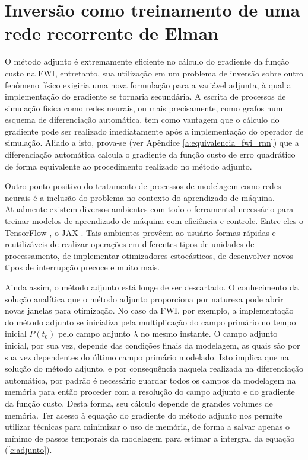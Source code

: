   \section{Inversão como treinamento de uma rede recorrente de Elman}

    O método adjunto é extremamente eficiente no cálculo do gradiente da função custo na FWI, entretanto, sua utilização em um problema de inversão sobre outro fenômeno físico exigiria uma nova formulação para a variável adjunta, à qual a implementação do gradiente se tornaria secundária. A escrita de processos de simulação física como redes neurais, ou mais precisamente, como grafos num esquema de diferenciação automática, tem como vantagem que o cálculo do gradiente pode ser realizado imediatamente após a implementação do operador de simulação. Aliado a isto, prova-se (ver Apêndice \ref{a:equivalencia_fwi_rnn}) que a diferenciação automática calcula o gradiente da função custo de erro quadrático de forma equivalente ao procedimento realizado no método adjunto.

    Outro ponto positivo do tratamento de processos de modelagem como redes neurais é a inclusão do problema no contexto do aprendizado de máquina. Atualmente existem diversos ambientes com todo o ferramental necessário para treinar modelos de aprendizado de máquina com eficiência e controle. Entre eles o TensorFlow , o JAX . Tais ambientes provêem ao usuário formas rápidas e reutilizáveis de realizar operações em diferentes tipos de unidades de processamento, de implementar otimizadores estocásticos, de desenvolver novos tipos de interrupção precoce e muito mais.

    Ainda assim, o método adjunto está longe de ser descartado. O conhecimento da solução analítica que o método adjunto proporciona por natureza pode abrir novas janelas para otimização. No caso da FWI, por exemplo, a implementação do método adjunto se inicializa pela multiplicação do campo primário no tempo inicial $P(t_0)$ pelo campo adjunto $\lambda$ no mesmo instante. O campo adjunto inicial, por sua vez, depende das condições finais da modelagem, as quais são por sua vez dependentes do último campo primário modelado. Isto implica que na solução do método adjunto, e por consequência naquela realizada na diferenciação automática, por padrão é necessário guardar todos os campos da modelagem na memória para então proceder com a resolução do campo adjunto e do gradiente da função custo. Desta forma, seu cálculo depende de grandes volumes de memória. Ter acesso à equação do gradiente do método adjunto nos permite utilizar técnicas para minimizar o uso de memória, de forma a salvar apenas o mínimo de passos temporais da modelagem para estimar a intergral da equação (\ref{e:adjunto}).


